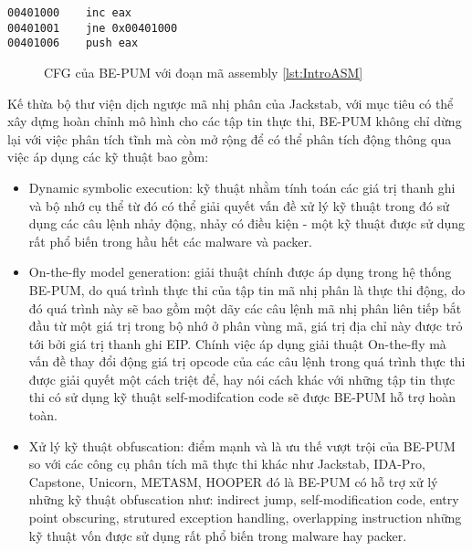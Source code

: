 \begin{code}
\begin{lstlisting}[captionpos=b,caption={Đoạn mã thực thi Assembly},label={lst:IntroASM},frame=single]
00401000	inc eax
00401001	jne 0x00401000
00401006 	push eax		
\end{lstlisting}
\end{code}

\begin{figure}
\centering
{}
\caption{CFG của BE-PUM với đoạn mã assembly \ref {lst:IntroASM}}
\label{fig:IntroCFG}
\end{figure}

\hspace{0.5cm}Kế thừa bộ thư viện dịch ngược mã nhị phân của Jackstab, với mục tiêu có thể xây dựng hoàn chỉnh mô hình cho các tập tin thực thi, BE-PUM không chỉ dừng lại với việc phân tích tĩnh mà còn mở rộng để có thể phân tích động thông qua việc áp dụng các kỹ thuật bao gồm:

\begin{itemize}
\item{Dynamic symbolic execution: kỹ thuật nhằm tính toán các giá trị thanh ghi và bộ nhớ cụ thể từ đó có thể giải quyết vấn đề xử lý kỹ thuật trong đó sử dụng các câu lệnh nhảy động, nhảy có điều kiện - một kỹ thuật được sử dụng rất phổ biến trong hầu hết các malware và packer.\\}
\item{On-the-fly model generation: giải thuật chính được áp dụng trong hệ thống BE-PUM, do quá trình thực thi của tập tin mã nhị phân là thực thi động, do đó quá trình này sẽ bao gồm một dãy các câu lệnh mã nhị phân liên tiếp bắt đầu từ một giá trị trong bộ nhớ ở phân vùng mã, giá trị địa chỉ này được trỏ tới bởi giá trị thanh ghi EIP. Chính việc áp dụng giải thuật On-the-fly mà vấn đề thay đổi động giá trị opcode của các câu lệnh trong quá trình thực thi được giải quyết một cách triệt để, hay nói cách khác với những tập tin thực thi có sử dụng kỹ thuật self-modifcation code sẽ được BE-PUM hỗ trợ hoàn toàn.\\}
\item{Xử lý kỹ thuật obfuscation: điểm mạnh và là ưu thế vượt trội của BE-PUM so với các công cụ phân tích mã thực thi khác như Jackstab, IDA-Pro, Capstone, Unicorn, METASM, HOOPER đó là BE-PUM có hỗ trợ xử lý những kỹ thuật obfuscation như: indirect jump, self-modification code, entry point obscuring, strutured exception handling, overlapping instruction những kỹ thuật vốn được sử dụng rất phổ biến trong malware hay packer.}
\end{itemize}

